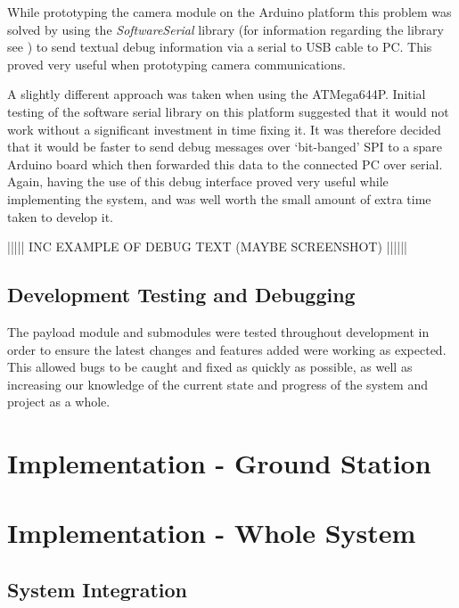 While prototyping the camera module on the Arduino platform this problem was 
solved by using the \emph{SoftwareSerial} library (for information regarding 
the library see \cite{software_serial}) to send textual debug information via
a serial to USB cable to PC. This proved very useful when prototyping camera
communications.

A slightly different approach was taken when using the ATMega644P. Initial 
testing of the software serial library on this platform suggested that it 
would not work without a significant investment in time fixing it. It was
therefore decided that it would be faster to send debug messages over 
`bit-banged' SPI to a spare Arduino board which then forwarded this data to 
the connected PC over serial. Again, having the use of this debug interface 
proved very useful while implementing the system, and was well worth the 
small amount of extra time taken to develop it.

||||| INC EXAMPLE OF DEBUG TEXT (MAYBE SCREENSHOT) ||||||

\section{Development Testing and Debugging}
The payload module and submodules were tested throughout development in order 
to ensure the latest changes and features added were working as expected. 
This allowed bugs to be caught and fixed as quickly as possible, as well as
increasing our knowledge of the current state and progress of the system and
project as a whole.



\chapter{Implementation - Ground Station}



\chapter{Implementation - Whole System}

\section{System Integration}

